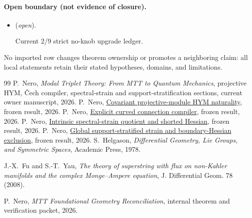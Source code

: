 \documentclass[11pt]{article}
\newcommand{\frozenresult}[2]{\href{https://github.com/PeterNero/mtt-results-repro/blob/f141a20ea23c5c3ff19cc2161c0e226e29ade8a7/release/results/#1/artifact.json}{#2}}
\begin{document}
\paragraph{Open boundary (not evidence of closure).}
\begin{itemize}
\setlength{\itemsep}{0.25em}
\item {} (\emph{open}).\par Current 2/9 strict no-knob upgrade ledger.
\end{itemize}

No imported row changes theorem ownership or promotes a neighboring claim: all local statements retain their stated hypotheses, domains, and limitations.

\begin{thebibliography}{99}
 P.~Nero, \emph{Modal Triplet Theory: From MTT to Quantum Mechanics}, projective HYM, \v{C}ech compiler, spectral-strain and support-stratification sections, current owner manuscript, 2026.
 P.~Nero, \frozenresult{q79_projective_hym_naturality}{Covariant projective-module HYM naturality}, frozen result, 2026.
 P.~Nero, \frozenresult{q79_cech_projector_compiler}{Explicit curved connection compiler}, frozen result, 2026.
 P.~Nero, \frozenresult{q79_spectral_strain_hessian}{Intrinsic spectral-strain quotient and shorted Hessian}, frozen result, 2026.
 P.~Nero, \frozenresult{q79_support_stratified_strain}{Global support-stratified strain and boundary-Hessian exclusion}, frozen result, 2026.
S.~Helgason, \emph{Differential Geometry, Lie Groups, and Symmetric Spaces},
Academic Press, 1978.

J.-X.~Fu and S.-T.~Yau,
\emph{The theory of superstring with flux on non-Kahler manifolds and the
complex Monge--Ampere equation}, J. Differential Geom. 78 (2008).

P.~Nero, \emph{MTT Foundational Geometry Reconciliation}, internal theorem
and verification packet, 2026.
\end{thebibliography}
\end{document}
